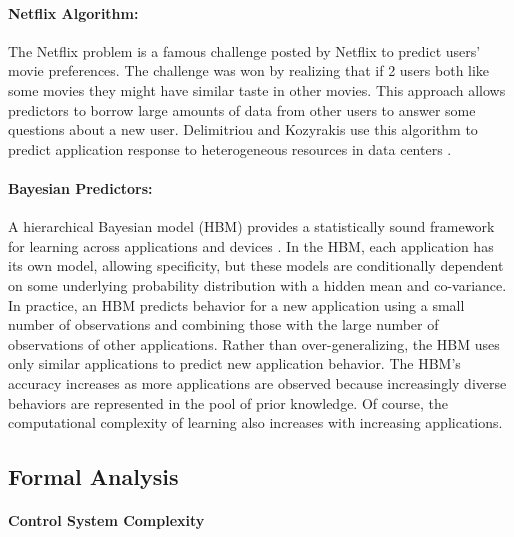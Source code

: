 \paragraph{Netflix Algorithm:}
The Netflix problem is a famous challenge posted by Netflix to predict
users' movie preferences. The challenge was won by realizing that if 2
users both like some movies they might have similar taste in other
movies. This approach allows predictors to borrow large amounts of
data from other users to answer some questions about a new user.
Delimitriou and Kozyrakis use this algorithm to predict application
response to heterogeneous resources in data centers
\cite{Paragon,quasar}.


\paragraph{ Bayesian Predictors:} A hierarchical Bayesian model (HBM)
provides a statistically sound framework for learning across
applications and devices \cite{LEO}.  In the HBM, each application has
its own model, allowing specificity, but these models are
conditionally dependent on some underlying probability distribution
with a hidden mean and co-variance.  In practice, an HBM predicts
behavior for a new application using a small number of observations
and combining those with the large number of observations of other
applications.  Rather than over-generalizing, the HBM uses only
similar applications to predict new application behavior.  The HBM's
accuracy increases as more applications are observed because
increasingly diverse behaviors are represented in the pool of prior
knowledge.  Of course, the computational complexity of learning also
increases with increasing applications.


\subsection{Formal Analysis}
\label{sec:guarantees}
\paragraph{Control System Complexity}

